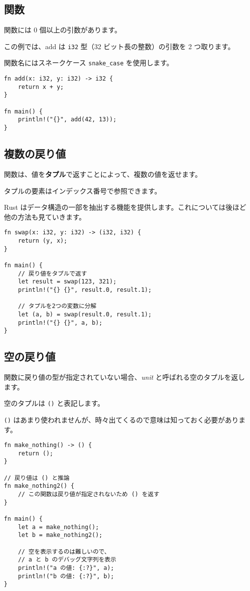 \subsection{関数}

関数には 0 個以上の引数があります。

この例では、add は \texttt{i32} 型（32 ビット長の整数）の引数を 2
つ取ります。

関数名にはスネークケース \texttt{snake\_case} を使用します。

\begin{verbatim}
fn add(x: i32, y: i32) -> i32 {
    return x + y;
}

fn main() {
    println!("{}", add(42, 13));
}
\end{verbatim}

\subsection{複数の戻り値}

関数は、値を\textbf{タプル}で返すことによって、複数の値を返せます。

タプルの要素はインデックス番号で参照できます。

Rust
はデータ構造の一部を抽出する機能を提供します。これについては後ほど他の方法も見ていきます。

\begin{verbatim}
fn swap(x: i32, y: i32) -> (i32, i32) {
    return (y, x);
}

fn main() {
    // 戻り値をタプルで返す
    let result = swap(123, 321);
    println!("{} {}", result.0, result.1);

    // タプルを2つの変数に分解
    let (a, b) = swap(result.0, result.1);
    println!("{} {}", a, b);
}
\end{verbatim}

\subsection{空の戻り値}

関数に戻り値の型が指定されていない場合、\emph{unit}
と呼ばれる空のタプルを返します。

空のタプルは \texttt{()} と表記します。

\texttt{()}
はあまり使われませんが、時々出てくるので意味は知っておく必要があります。

\begin{verbatim}
fn make_nothing() -> () {
    return ();
}

// 戻り値は () と推論
fn make_nothing2() {
    // この関数は戻り値が指定されないため () を返す
}

fn main() {
    let a = make_nothing();
    let b = make_nothing2();

    // 空を表示するのは難しいので、
    // a と b のデバッグ文字列を表示
    println!("a の値: {:?}", a);
    println!("b の値: {:?}", b);
}
\end{verbatim}

